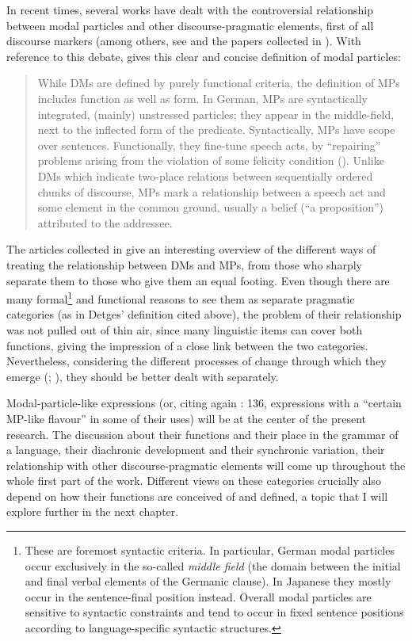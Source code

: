 In recent times, several works have dealt with the controversial relationship between modal particles and other discourse-pragmatic elements, first of all discourse markers (among others, see \citealt{Hansen1998a} and the papers collected in \citealt{DegandEtAl2013}). With reference to this debate, \citet{Detges2015} gives this clear and concise definition of modal particles:\largerpage

\begin{quote}
While DMs are defined by purely functional criteria, the definition of MPs includes function as well as form. In German, MPs are syntactically integrated, (mainly) unstressed particles; they appear in the middle-field, next to the inflected form of the predicate. Syntactically, MPs have scope over sentences. Functionally, they fine-tune speech acts, by “repairing” problems arising from the violation of some felicity condition (\citealt{Waltereit2001,Waltereit2006}). Unlike DMs which indicate two-place relations between sequentially ordered chunks of discourse, MPs mark a relationship between a speech act and some element in the common ground, usually a belief (“a proposition”) attributed to the addressee. \citep[132]{Detges2015}
\end{quote}

The articles collected in \citet{DegandEtAl2013} give an interesting overview of the different ways of treating the relationship between DMs and MPs, from those who sharply separate them to those who give them an equal footing. Even though there are many formal\footnote{These are foremost syntactic criteria. In particular, German modal particles occur exclusively in the so-called \textit{middle field} (the domain between the initial and final verbal elements of the Germanic clause). In Japanese they mostly occur in the sentence-final position instead. Overall modal particles are sensitive to syntactic constraints and tend to occur in fixed sentence positions according to language-specific syntactic structures.}  and functional reasons to see them as separate pragmatic categories (as in Detges’ definition cited above), the problem of their relationship was not pulled out of thin air, since many linguistic items can cover both functions, giving the impression of a close link between the two categories. Nevertheless, considering the different processes of change through which they emerge (\citealt{WaltereitDetges2007}; \citealt{DetgesWaltereit2009}), they should be better dealt with separately.

Modal-particle-like expressions (or, citing again \citealt{Detges2015}: 136, expressions with a “certain MP-like flavour” in some of their uses) will be at the center of the present research. The discussion about their functions and their place in the grammar of a language, their diachronic development and their synchronic variation, their relationship with other discourse-pragmatic elements will come up throughout the whole first part of the work. Different views on these categories crucially also depend on how their functions are conceived of and defined, a topic that I will explore further in the next chapter.

